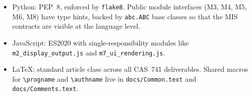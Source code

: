 \documentclass{article}
\begin{document}
\begin{itemize}
  \item Python: PEP~8, enforced by \texttt{flake8}. Public module
    interfaces (M3, M4, M5, M6, M8) have type hints, backed by
    \texttt{abc.ABC} base classes so that the MIS contracts are
    visible at the language level.
  \item JavaScript: ES2020 with single-responsibility modules like
    \texttt{m2\_display\_output.js} and \texttt{m7\_ui\_rendering.js}.
  \item LaTeX: standard article class across all CAS~741 deliverables.
    Shared macros for \texttt{\textbackslash progname} and
    \texttt{\textbackslash authname} live in
    \texttt{docs/Common.text} and \texttt{docs/Comments.text}.
\end{itemize}
\end{document}
